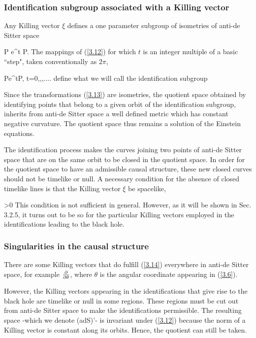 
\subsubsection{Identification subgroup associated with a Killing vector}

Any Killing vector $\xi$ defines a one parameter subgroup of
isometries of anti-de Sitter space

\bb
P \rightarrow e^{t\xi} P.
\label{3.12}
\ee
%
The mappings of (\ref{3.12}) for which $t$ is an integer
multiple of a basic ``step", taken conventionally as $2\pi$,

\bb
P\rightarrow e^{t\xi}P, \;\;\;\;\;  t=0,\pi,\pi,....
\label{3.13}
\ee
%
define what we will call the identification subgroup

Since the transformations (\ref{3.13}) are isometries, the
quotient space obtained by identifying points that belong to a
given orbit of the identification subgroup, inherits from
anti-de Sitter space a well defined metric which has constant
negative curvature. The quotient space thus remains a solution
of the Einstein equations.

The identification process makes the curves joining two points
of anti-de Sitter space that are on the same orbit to be closed
in the quotient space. In order for the quotient space to have an
admissible causal structure, these new closed curves should not
be timelike or null. A necessary condition for the absence of closed
timelike lines is that the Killing vector $\xi$ be spacelike,

\bb
\xi \cdot \xi >0
\label{3.14}
\ee
%
This condition is not sufficient in general. However, as it
will be shown in Sec. 3.2.5, it turns out to be so for the
particular Killing vectors employed in the identifications
leading to the black hole.


\subsubsection{Singularities in the causal structure}

There are some Killing vectors that do fulfill (\ref{3.14})
everywhere in anti-de Sitter space, for example $\frac{\partial}{\partial
\theta}$, where $\theta$ is the angular coordinate appearing in
(\ref{3.6}).

However, the Killing vectors appearing in the identifications
that give rise to the black hole are timelike or null in some
regions.  These regions must be cut out from anti-de Sitter
space to make the identifications permissible. The resulting
space -which we denote (adS)'- is invariant under (\ref{3.12})
because the norm of a Killing vector is constant along its
orbits. Hence, the quotient can still be taken.

